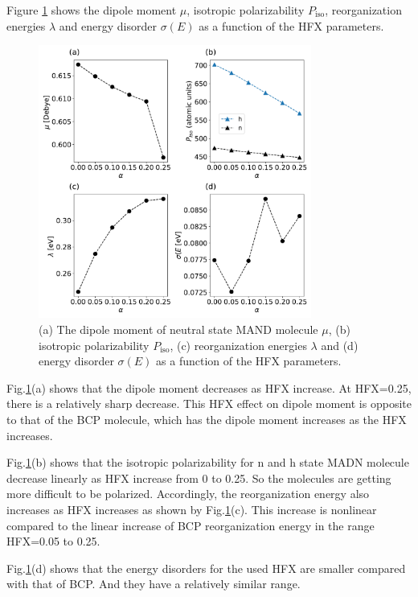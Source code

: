 \documentclass[letterpaper,12pt]{article}
\begin{document}
Figure \ref{fig:autogen_MADN} shows the dipole moment $\mu$, isotropic polarizability $P_\text{iso}$,  reorganization energies $\lambda$ and energy disorder $\sigma(E)$ as a function of the HFX parameters.
%
\begin{figure}[H]
    \centering
    \includegraphics[width=0.80\textwidth]{figs/MADN_HFX/fig_autogen.pdf}
    \caption{(a) The dipole moment of neutral state MAND molecule $\mu$, (b) isotropic polarizability $P_\text{iso}$, (c) reorganization energies $\lambda$ and (d) energy disorder $\sigma(E)$ as a function of the HFX parameters.}
    \label{fig:autogen_MADN}
\end{figure}
% 

Fig.\ref{fig:autogen_MADN}(a) shows that the dipole moment decreases as HFX increase. At HFX=0.25, there is a relatively sharp decrease. This HFX effect on dipole moment is opposite to that of the BCP molecule, which has the dipole moment increases as the HFX increases.

Fig.\ref{fig:autogen_MADN}(b) shows that the isotropic polarizability for n and h state MADN molecule decrease linearly as HFX increase from 0 to 0.25. 
So the molecules are getting more difficult to be polarized. 
Accordingly, the reorganization energy also increases as HFX increases as shown by Fig.\ref{fig:autogen_MADN}(c). This increase is nonlinear compared to the linear increase of BCP reorganization energy in the range HFX=0.05 to 0.25. 

Fig.\ref{fig:autogen_MADN}(d) shows that the energy disorders for the used HFX are smaller compared with that of BCP. And they have a relatively similar range.
\end{document}
